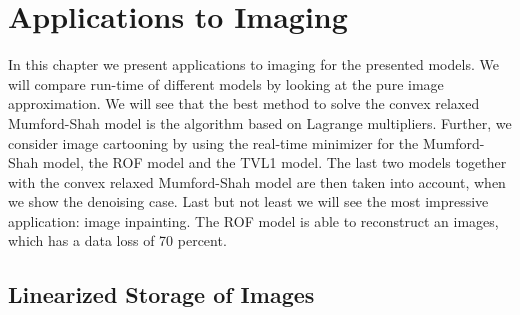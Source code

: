 \documentclass{scrreprt}
\begin{document}
    
    
    
    
    


\chapter{Applications to Imaging} %
\label{cha:applications_to_imaging}

    In this chapter we present applications to imaging for the presented models. We will compare run-time of different models by looking at the pure image approximation. We will see that the best method to solve the convex relaxed Mumford-Shah model is the algorithm based on Lagrange multipliers. Further, we consider image cartooning by using the real-time minimizer for the Mumford-Shah model, the ROF model and the TVL1 model. The last two models together with the convex relaxed Mumford-Shah model are then taken into account, when we show the denoising case. Last but not least we will see the most impressive application: image inpainting. The ROF model is able to reconstruct an images, which has a data loss of 70 percent.

    \section{Linearized Storage of Images} %
    \label{sec:linearized_storage_of_images}
        
\end{document}
